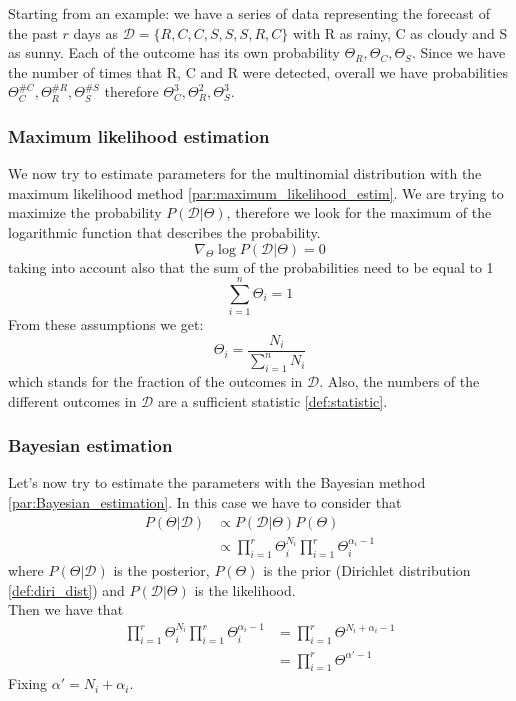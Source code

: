         Starting from an example: we have a series of data representing the forecast of the past $r$ days as $\mathcal{D} = \{R, C, C, S, S, S, R, C\}$ with R as rainy, C as cloudy and S as sunny.
        Each of the outcome has its own probability $\Theta_R, \Theta_C, \Theta_S$. Since we have the number of times that R, C and R were detected, overall we have probabilities $\Theta_C^{\#C}, \Theta_R^{\#R}, \Theta_S^{\#S}$ therefore $\Theta_C^{3}, \Theta_R^{2}, \Theta_S^{3}$.
        
        \subsubsection{Maximum likelihood estimation}
            We now try to estimate parameters for the multinomial distribution with the maximum likelihood method \ref{par:maximum_likelihood_estim}. We are trying to maximize the probability $P(\mathcal{D}|\Theta)$, therefore we look for the maximum of the logarithmic function that describes the probability.
            $$\nabla_\Theta \log P(\mathcal{D}|\Theta) = 0$$
            taking into account also that the sum of the probabilities need to be equal to 1
            $$\sum_{i=1}^n \Theta_i = 1$$
            From these assumptions we get:
            $$\Theta_i = \frac{N_i}{\sum_{i=1}^n N_i}$$
            which stands for the fraction of the outcomes in $\mathcal{D}$. Also, the numbers of the different outcomes in $\mathcal{D}$ are a sufficient statistic \ref{def:statistic}.
            
        \subsubsection{Bayesian estimation}
            Let's now try to estimate the parameters with the Bayesian method \ref{par:Bayesian_estimation}. In this case we have to consider that
            \begin{align*}
                P(\Theta|\mathcal{D}) &\propto P(\mathcal{D}|\Theta)P(\Theta)\\
                &\propto \prod_{i=1}^r \Theta_i^{N_i} \prod_{i=1}^r \Theta_i^{\alpha_i -1}
            \end{align*}
            where $ P(\Theta|\mathcal{D})$ is the posterior, $P(\Theta)$ is the prior (Dirichlet distribution \ref{def:diri_dist}) and $P(\mathcal{D}|\Theta)$ is the likelihood.\\
            Then we have that
            \begin{align*}
                \prod_{i=1}^r \Theta_i^{N_i} \prod_{i=1}^r \Theta_i^{\alpha_i -1} &= \prod_{i=1}^r \Theta^{N_i + \alpha_i -1}\\
                &= \prod_{i=1}^r \Theta^{\alpha' -1}
            \end{align*}
            Fixing $\alpha' = N_i + \alpha_i$.\\
            
